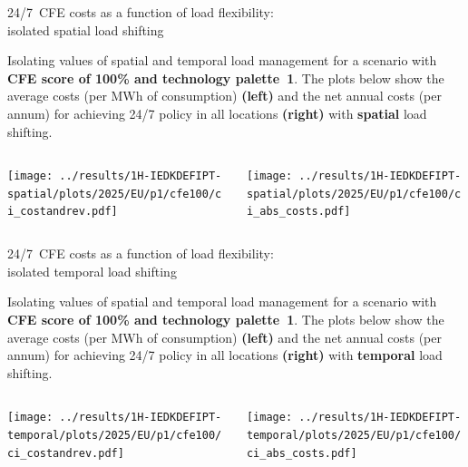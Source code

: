 \begin{frame}{24/7~CFE costs as a function of load flexibility:\\
  isolated spatial load shifting}
  \label{isolated_spatial_cfe100_p1}

  {\footnotesize
  \vspace{0.2cm}
  
  Isolating values of spatial and temporal load management for a scenario with {\bf CFE score of 100\% and technology palette~1}. 
  The plots below show the average costs (per MWh of consumption) {\bf (left)} and the net annual costs (per annum) for achieving 24/7 policy in all locations {\bf (right)} with {\bf spatial} load shifting.

  \begin{columns}[T]
  \begin{column}{8cm}
  \centering
  \texttt{[image: ../results/1H-IEDKDEFIPT-spatial/plots/2025/EU/p1/cfe100/ci\_costandrev.pdf]}
  \end{column}

  \begin{column}{7cm}
    \texttt{[image: ../results/1H-IEDKDEFIPT-spatial/plots/2025/EU/p1/cfe100/ci\_abs\_costs.pdf]}
  \end{column}
  \end{columns}
  }
\end{frame}


\begin{frame}{24/7~CFE costs as a function of load flexibility:\\
  isolated temporal load shifting}
  \label{isolated_temporal_cfe100_p1}

  {\footnotesize
  \vspace{0.2cm}
  
  Isolating values of spatial and temporal load management for a scenario with {\bf CFE score of 100\% and technology palette~1}. 
  The plots below show the average costs (per MWh of consumption) {\bf (left)} and the net annual costs (per annum) for achieving 24/7 policy in all locations {\bf (right)} with {\bf temporal} load shifting.

  \begin{columns}[T]
  \begin{column}{8cm}
  \centering
  \texttt{[image: ../results/1H-IEDKDEFIPT-temporal/plots/2025/EU/p1/cfe100/ci\_costandrev.pdf]}
  \end{column}

  \begin{column}{7cm}
    \texttt{[image: ../results/1H-IEDKDEFIPT-temporal/plots/2025/EU/p1/cfe100/ci\_abs\_costs.pdf]}
  \end{column}
  \end{columns}
  }
\end{frame}




